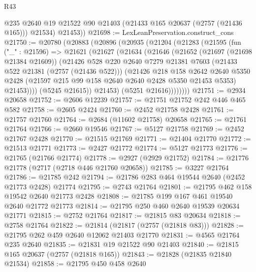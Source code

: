 \begin{lexlean}{R43}
\begin{coremodule}
          @235
          @2640
          @19
          @21522
          @90
          @21403
          (@21433 @165 @20637 (@2757 (@21436 @165)))
          @21534)
        @21453))
@21698 := LexLeanPreservation.construct_cons
@21750 := @20780
    (@20883
      (@20896
        (@20935
          (@21204
            (@21283
              (@21595
                (fun ("_" : @21596) =>
                @21621
                  (@21627
                    (@21634
                      (@21646
                        (@21652
                          (@21697 (@21698 @21384 @21609))
                          (@21426
                            @528
                            @220
                            @2640
                            @7279
                            @21381
                            @7603
                            (@21433 @522 @21381 (@2757 (@21436 @522)))
                            (@21426
                              @218
                              @158
                              @2642
                              @2640
                              @5350
                              @2428
                              (@21597 @215 @99 @158 @2640 @2640 @2428 @5350 @21453 @5353)
                              @21453))))
                      (@5245 @21615))
                    @21453)
                  (@5251 @21616))))))))
@21751 := @2934 @20658
@21752 := @2606 @12239
@21757 := @21751 @21752 @242 @446 @465 @582
@21758 := @2605 @2424
@21760 := @2452 @21758 @2428
@21761 := @21757 @21760
@21764 := @2684 (@11602 @21758) @20658
@21765 := @21761 @21764
@21766 := @2660 @19546
@21767 := @5127 @21758
@21769 := @2452 @21767 @2428
@21770 := @21515 @21769
@21771 := @21404 @21770
@21772 := @21513 @21771
@21773 := @2427 @21772
@21774 := @5127 @21773
@21776 := @21765 (@21766 @21774)
@21778 := @2927 (@2929 @21752)
@21784 := @21776 @21778 (@2717 (@2718 @446 @21760 @20658))
@21785 := @3227 @21764
@21786 := @21785 @242
@21794 := @21786 @283 @464 @19544 @2640 (@2452 @21773 @2428) @21774
@21795 := @2743 @21764
@21801 := @21795 @462 @158 @19542 @2640 @21773 @2428
@21808 := @21785 @199 @167 @461 @19540 @2640 @21772 @21773
@21814 := @21795 @250 @460 @2640 @19539 @20634 @21771
@21815 := @2752 @21764
@21817 := @21815 @83 @20634
@21818 := @2758 @21764
@21822 := @21814 (@21817 (@2757 (@21818 @83)))
@21828 := @21795 @262 @459 @2640 @12062 @21403 @21770
@21831 := @4565 @21764 @235 @2640
@21835 := @21831 @19 @21522 @90 @21403
@21840 := @21815 @165 @20637 (@2757 (@21818 @165))
@21843 := @21828 (@21835 @21840 @21534)
@21858 := @21795
    @450
    @458
    @2640

\end{coremodule}
\end{lexlean}
